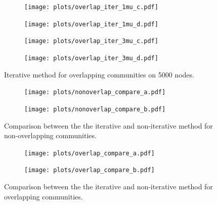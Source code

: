 \begin{figure}
    \centering
    \begin{subfigure}{0.5\textwidth}
    \centering
    \texttt{[image: plots/overlap\_iter\_1mu\_c.pdf]}
    \end{subfigure}%
    \begin{subfigure}{0.5\textwidth}
    \centering
    \texttt{[image: plots/overlap\_iter\_1mu\_d.pdf]}
    \end{subfigure}
    \begin{subfigure}{0.5\textwidth}
    \centering
    \texttt{[image: plots/overlap\_iter\_3mu\_c.pdf]}
    \end{subfigure}%
    \begin{subfigure}{0.5\textwidth}
    \centering
    \texttt{[image: plots/overlap\_iter\_3mu\_d.pdf]}
    \end{subfigure}
    \caption{Iterative method for overlapping communities on 5000 nodes.}\label{fig:iter_overlap_5000N}
\end{figure}

\begin{figure}
    \centering
    \begin{subfigure}{0.5\textwidth}
    \centering
    \texttt{[image: plots/nonoverlap\_compare\_a.pdf]}
    \end{subfigure}%
    \begin{subfigure}{0.5\textwidth}
    \centering
    \texttt{[image: plots/nonoverlap\_compare\_b.pdf]}
    \end{subfigure}
    \caption{Comparison between the the iterative and non-iterative method for non-overlapping communities.}\label{fig:compare_iter_no_overlap}
\end{figure}


\begin{figure}
    \centering
    \begin{subfigure}{0.5\textwidth}
    \centering
    \texttt{[image: plots/overlap\_compare\_a.pdf]}
    \end{subfigure}%
    \begin{subfigure}{0.5\textwidth}
    \centering
    \texttt{[image: plots/overlap\_compare\_b.pdf]}
    \end{subfigure}
    \caption{Comparison between the the iterative and non-iterative method for overlapping communities.}\label{fig:compare_iter_overlap}
\end{figure}


